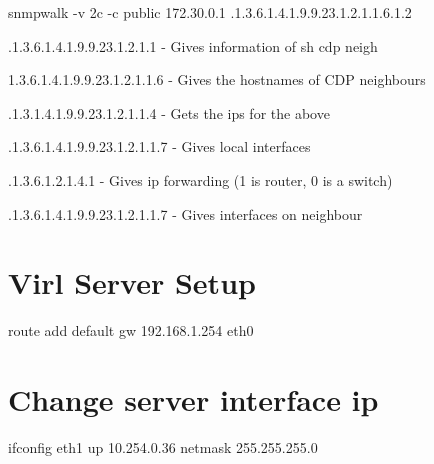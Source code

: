 \documentclass[11pt]{report}
\begin{document}
snmpwalk -v 2c -c public 172.30.0.1 .1.3.6.1.4.1.9.9.23.1.2.1.1.6.1.2

.1.3.6.1.4.1.9.9.23.1.2.1.1 - Gives information of sh cdp neigh

1.3.6.1.4.1.9.9.23.1.2.1.1.6  - Gives the hostnames of CDP neighbours 

.1.3.1.4.1.9.9.23.1.2.1.1.4 - Gets the ips for the above

.1.3.6.1.4.1.9.9.23.1.2.1.1.7 - Gives local interfaces

.1.3.6.1.2.1.4.1 - Gives ip forwarding (1 is router, 0 is a switch)

.1.3.6.1.4.1.9.9.23.1.2.1.1.7 - Gives interfaces on neighbour

\section{Virl Server Setup}
route add default gw 192.168.1.254 eth0

\section{Change server interface ip}
ifconfig eth1 up 10.254.0.36 netmask 255.255.255.0



\end{document}
